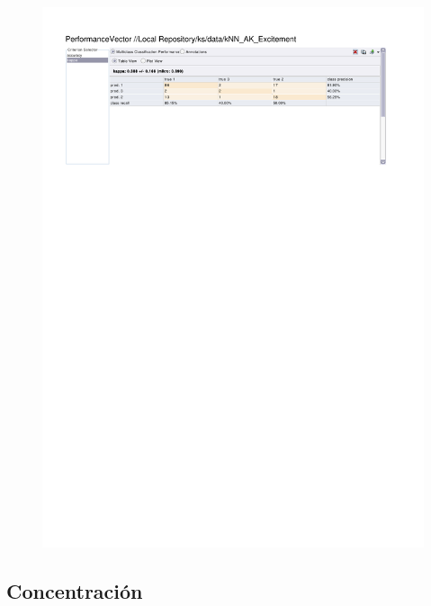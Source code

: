 \begin{figure}[htp]
  \centerline{\includegraphics[trim=0 680 0 60,clip,width=16.09cm]{results/kNN_K_Excitement.pdf}} \caption{
} \label{kNN_K_Excitement}
\end{figure}

\clearpage
\FloatBarrier
\subsection{Concentración}

